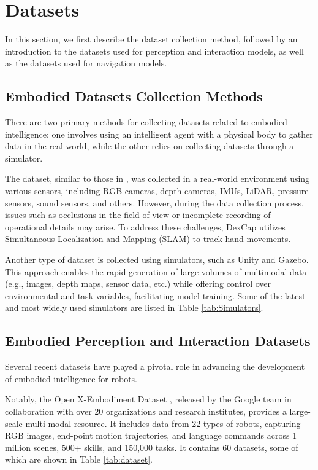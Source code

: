 \section{Datasets}
\label{sec:DATA}
In this section, we first describe the dataset collection method, followed by an introduction to the datasets used for perception and interaction models, as well as the datasets used for navigation models.

\subsection{Embodied Datasets Collection Methods}

There are two primary methods for collecting datasets related to embodied intelligence: one involves using an intelligent agent with a physical body to gather data in the real world, while the other relies on collecting datasets through a simulator.

The dataset, similar to those in  \cite{o2024open, wang2024all}, was collected in a real-world environment using various sensors, including RGB cameras, depth cameras, IMUs, LiDAR, pressure sensors, sound sensors, and others. However, during the data collection process, issues such as occlusions in the field of view or incomplete recording of operational details may arise. To address these challenges, DexCap  \cite{wang2024dexcap} utilizes Simultaneous Localization and Mapping (SLAM) to track hand movements.

Another type of dataset is collected using simulators, such as Unity and Gazebo. This approach enables the rapid generation of large volumes of multimodal data (e.g., images, depth maps, sensor data, etc.) while offering control over environmental and task variables, facilitating model training. Some of the latest and most widely used simulators are listed in Table \ref{tab:Simulators}.

\subsection{Embodied Perception and Interaction Datasets}

Several recent datasets have played a pivotal role in advancing the development of embodied intelligence for robots.

Notably, the Open X-Embodiment Dataset \cite{o2024open}, released by the Google team in collaboration with over 20 organizations and research institutes, provides a large-scale multi-modal resource. It includes data from 22 types of robots, capturing RGB images, end-point motion trajectories, and language commands across 1 million scenes, 500+ skills, and 150,000 tasks. It contains 60 datasets, some of which are shown in Table \ref{tab:dataset}.

